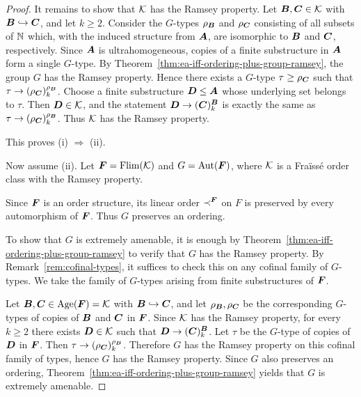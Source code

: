 \begin{proof}
    It remains to show that \(\mathcal{K}\) has the Ramsey property.
    Let \(\boldsymbol{B},\boldsymbol{C}\in\mathcal{K}\) with \(\boldsymbol{B}\hookrightarrow \boldsymbol{C}\), and let \(k\geq 2\).
    Consider the \(G\)-types \(\rho_{\boldsymbol{B}}\) and \(\rho_{\boldsymbol{C}}\) consisting of all subsets of \(\mathbb{N}\) which, with the induced structure from \(\boldsymbol{A}\), are isomorphic to \(\boldsymbol{B}\) and \(\boldsymbol{C}\), respectively.
    Since \(\boldsymbol{A}\) is ultrahomogeneous, copies of a finite substructure in \(\boldsymbol{A}\) form a single \(G\)-type.
    By Theorem~\ref{thm:ea-iff-ordering-plus-group-ramsey}, the group \(G\) has the Ramsey property.
    Hence there exists a \(G\)-type \(\tau\geq \rho_{\boldsymbol{C}}\) such that \(\tau\to (\rho_{\boldsymbol{C}})^{\rho_{\boldsymbol{B}}}_k\).
    Choose a finite substructure \(\boldsymbol{D}\leq \boldsymbol{A}\) whose underlying set belongs to \(\tau\).
    Then \(\boldsymbol{D}\in\mathcal{K}\), and the statement \(\boldsymbol{D}\to (\boldsymbol{C})^{\boldsymbol{B}}_k\) is exactly the same as \(\tau\to (\rho_{\boldsymbol{C}})^{\rho_{\boldsymbol{B}}}_k\).
    Thus \(\mathcal{K}\) has the Ramsey property.

    This proves (i) \(\Rightarrow\) (ii).

    Now assume (ii). Let \(\boldsymbol{F}=\operatorname{Flim}(\mathcal{K})\) and \(G=\operatorname{Aut}(\boldsymbol{F})\), where \(\mathcal{K}\) is a Fraïssé order class with the Ramsey property.

    Since \(\boldsymbol{F}\) is an order structure, its linear order \(\prec^{\boldsymbol{F}}\) on \(F\) is preserved by every automorphism of \(\boldsymbol{F}\). Thus \(G\) preserves an ordering.

    To show that \(G\) is extremely amenable, it is enough by Theorem~\ref{thm:ea-iff-ordering-plus-group-ramsey} to verify that \(G\) has the Ramsey property. By Remark~\ref{rem:cofinal-types}, it suffices to check this on any cofinal family of \(G\)-types. We take the family of \(G\)-types arising from finite substructures of \(\boldsymbol{F}\).

    Let \(\boldsymbol{B},\boldsymbol{C}\in\operatorname{Age}(\boldsymbol{F})=\mathcal{K}\) with \(\boldsymbol{B}\hookrightarrow \boldsymbol{C}\), and let \(\rho_{\boldsymbol{B}},\rho_{\boldsymbol{C}}\) be the corresponding \(G\)-types of copies of \(\boldsymbol{B}\) and \(\boldsymbol{C}\) in \(\boldsymbol{F}\). Since \(\mathcal{K}\) has the Ramsey property, for every \(k\geq 2\) there exists \(\boldsymbol{D}\in\mathcal{K}\) such that \(\boldsymbol{D}\to (\boldsymbol{C})^{\boldsymbol{B}}_k\). Let \(\tau\) be the \(G\)-type of copies of \(\boldsymbol{D}\) in \(\boldsymbol{F}\). Then \(\tau\to (\rho_{\boldsymbol{C}})^{\rho_{\boldsymbol{B}}}_k\).
    Therefore \(G\) has the Ramsey property on this cofinal family of types, hence \(G\) has the Ramsey property. Since \(G\) also preserves an ordering, Theorem~\ref{thm:ea-iff-ordering-plus-group-ramsey} yields that \(G\) is extremely amenable.
\end{proof}

